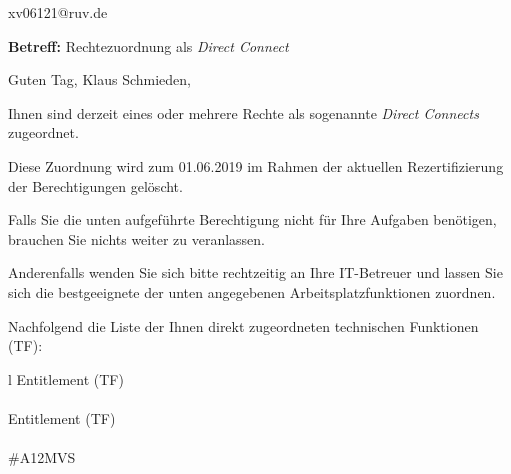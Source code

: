 \documentclass[a4paper,landscape,12pt]{letter}
\begin{document}
\begin{letter}{xv06121@ruv.de\hfill \break}
\begin{normalsize}
	\opening{\textbf{Betreff:} Rechtezuordnung als \emph{Direct Connect}}
	\begin{normalsize} \hfill
	\end{normalsize}

	\begin{normalsize}
		Guten Tag, 
	Klaus Schmieden, \hfill \break
	\end{normalsize}
	\end{normalsize}
	
\begin{normalsize}
	Ihnen sind derzeit eines oder mehrere Rechte als sogenannte \emph{Direct Connects} zugeordnet.
	
	Diese Zuordnung wird zum 01.06.2019 im Rahmen der aktuellen Rezertifizierung der Berechtigungen gelöscht.
	
	Falls Sie die unten aufgeführte Berechtigung nicht für Ihre Aufgaben benötigen, 
	brauchen Sie nichts weiter zu veranlassen.
	
	Anderenfalls wenden Sie sich bitte rechtzeitig an Ihre IT-Betreuer 
	und lassen Sie sich die bestgeeignete der unten angegebenen Arbeitsplatzfunktionen zuordnen.
	\end{normalsize}
	
\begin{normalsize}
	Nachfolgend die Liste der Ihnen direkt zugeordneten technischen Funktionen (TF):

	\begin{longtable}{l}
		Entitlement (TF) \\ \hline
		\endfirsthead
		\\\hline
		Entitlement (TF) \\ \hline
		\endhead %
		\multicolumn{1}{r@{}}{Fortsetzung \ldots}\\
		\endfoot
		\hline
		\endlastfoot
	\#A12MVS\\
	\end{longtable}
	\end{normalsize}
	

\end{letter}
\end{document}
